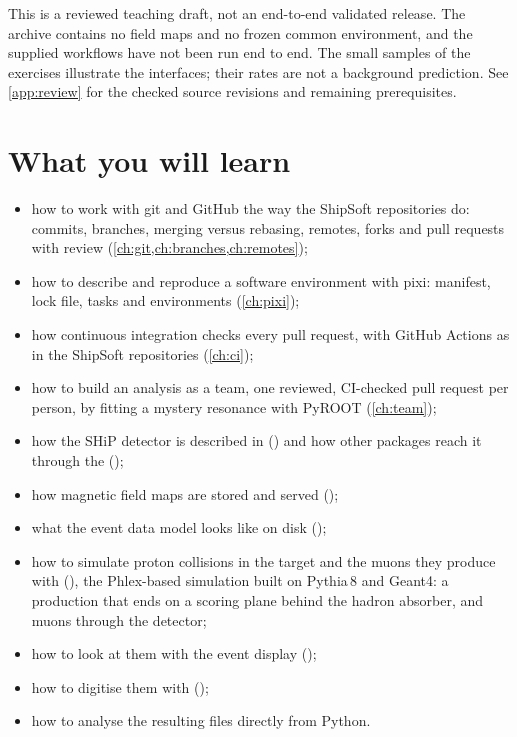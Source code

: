 \begin{pitfall}
This is a reviewed teaching draft, not an end-to-end validated release.
The archive contains no field maps and no frozen common environment, and the
supplied workflows have not been run end to end. The small samples of the
exercises illustrate the interfaces; their rates are not a background
prediction. See \cref{app:review} for the checked source revisions and
remaining prerequisites.
\end{pitfall}

\section*{What you will learn}

\begin{itemize}
  \item how to work with git and GitHub the way the ShipSoft repositories
        do: commits, branches, merging versus rebasing, remotes, forks and
        pull requests with review (\cref{ch:git,ch:branches,ch:remotes});
  \item how to describe and reproduce a software environment with pixi:
        manifest, lock file, tasks and environments (\cref{ch:pixi});
  \item how continuous integration checks every pull request, with GitHub
        Actions as in the ShipSoft repositories (\cref{ch:ci});
  \item how to build an analysis as a team, one reviewed, CI-checked pull
        request per person, by fitting a mystery resonance with PyROOT
        (\cref{ch:team});
  \item how the SHiP detector is described in 
        () and how other packages reach it through the
         ();
  \item how magnetic field maps are stored and served
        ();
  \item what the event data model looks like on disk ();
  \item how to simulate proton collisions in the target and the muons they
        produce with  (), the Phlex-based simulation
        built on Pythia\,8 and Geant4: a production that ends on a scoring
        plane behind the hadron absorber, and muons through the detector;
  \item how to look at them with the event display 
        ();
  \item how to digitise them with  ();
  \item how to analyse the resulting files directly from Python.
\end{itemize}

